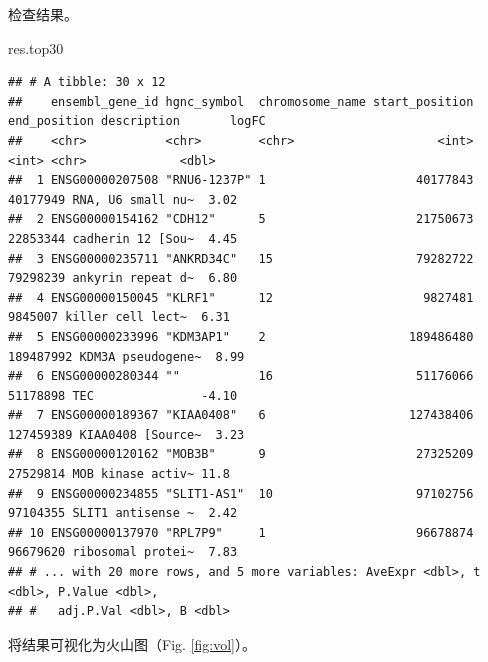 \documentclass[
]{article}
\newenvironment{Shaded}{\begin{snugshade}}{\end{snugshade}}
\newcommand{\NormalTok}[1]{#1}
\begin{document}
检查结果。

\begin{Shaded}
\begin{Highlighting}[]
\NormalTok{res.top30}
\end{Highlighting}
\end{Shaded}

\begin{verbatim}
## # A tibble: 30 x 12
##    ensembl_gene_id hgnc_symbol  chromosome_name start_position end_position description       logFC
##    <chr>           <chr>        <chr>                    <int>        <int> <chr>             <dbl>
##  1 ENSG00000207508 "RNU6-1237P" 1                     40177843     40177949 RNA, U6 small nu~  3.02
##  2 ENSG00000154162 "CDH12"      5                     21750673     22853344 cadherin 12 [Sou~  4.45
##  3 ENSG00000235711 "ANKRD34C"   15                    79282722     79298239 ankyrin repeat d~  6.80
##  4 ENSG00000150045 "KLRF1"      12                     9827481      9845007 killer cell lect~  6.31
##  5 ENSG00000233996 "KDM3AP1"    2                    189486480    189487992 KDM3A pseudogene~  8.99
##  6 ENSG00000280344 ""           16                    51176066     51178898 TEC               -4.10
##  7 ENSG00000189367 "KIAA0408"   6                    127438406    127459389 KIAA0408 [Source~  3.23
##  8 ENSG00000120162 "MOB3B"      9                     27325209     27529814 MOB kinase activ~ 11.8 
##  9 ENSG00000234855 "SLIT1-AS1"  10                    97102756     97104355 SLIT1 antisense ~  2.42
## 10 ENSG00000137970 "RPL7P9"     1                     96678874     96679620 ribosomal protei~  7.83
## # ... with 20 more rows, and 5 more variables: AveExpr <dbl>, t <dbl>, P.Value <dbl>,
## #   adj.P.Val <dbl>, B <dbl>
\end{verbatim}

将结果可视化为火山图（Fig. \ref{fig:vol}）。
\end{document}

